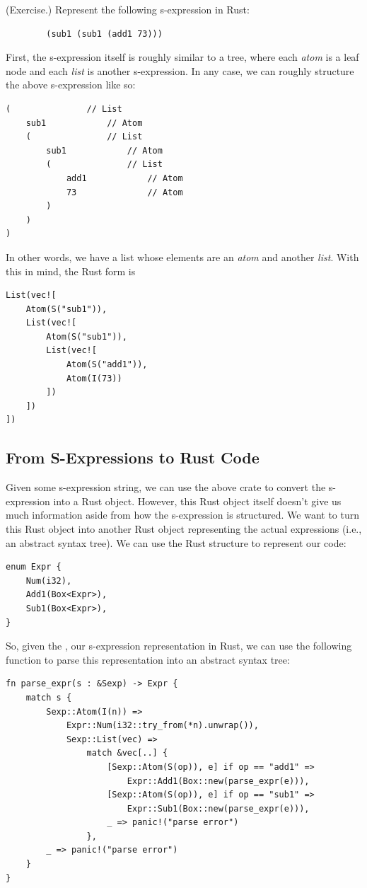 \begin{mdframed}
    (Exercise.) Represent the following s-expression in Rust: 
    \begin{verbatim}
        (sub1 (sub1 (add1 73)))\end{verbatim}
    
    \begin{mdframed}
        First, the s-expression itself is roughly similar to a tree, where each \emph{atom} is a leaf node and each \emph{list} is another s-expression. In any case, we can roughly structure the above s-expression like so: 
        \begin{verbatim}
(               // List
    sub1            // Atom 
    (               // List 
        sub1            // Atom 
        (               // List 
            add1            // Atom 
            73              // Atom 
        )
    )
) \end{verbatim}
        In other words, we have a list whose elements are an \emph{atom} and another \emph{list}. With this in mind, the Rust form is
        \begin{verbatim}
List(vec![
    Atom(S("sub1")),
    List(vec![
        Atom(S("sub1")),
        List(vec![
            Atom(S("add1")),
            Atom(I(73))
        ])
    ])
])\end{verbatim}
    \end{mdframed}
\end{mdframed}

\subsection{From S-Expressions to Rust Code}
Given some s-expression string, we can use the above crate to convert the s-expression into a Rust object. However, this Rust object itself doesn't give us much information aside from how the s-expression is structured. We want to turn this Rust object into another Rust object representing the actual expressions (i.e., an abstract syntax tree). We can use the Rust structure to represent our code: 
\begin{verbatim}
enum Expr {
    Num(i32),
    Add1(Box<Expr>),
    Sub1(Box<Expr>),
}\end{verbatim}
So, given the , our s-expression representation in Rust, we can use the following function to parse this representation into an abstract syntax tree: 
\begin{verbatim}
fn parse_expr(s : &Sexp) -> Expr {
    match s {
        Sexp::Atom(I(n)) =>
            Expr::Num(i32::try_from(*n).unwrap()),
            Sexp::List(vec) =>
                match &vec[..] {
                    [Sexp::Atom(S(op)), e] if op == "add1" =>
                        Expr::Add1(Box::new(parse_expr(e))),
                    [Sexp::Atom(S(op)), e] if op == "sub1" =>
                        Expr::Sub1(Box::new(parse_expr(e))),
                    _ => panic!("parse error")
	            },
        _ => panic!("parse error")
    }
}\end{verbatim}


